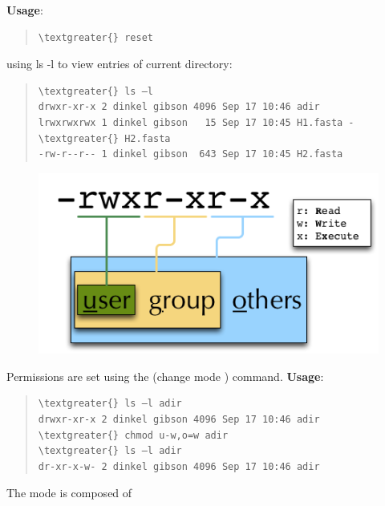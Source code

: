 \documentclass[letterpaper,10pt,english]{sphinxmanual}
\begin{document}
\textbf{Usage}:  
\begin{quote}

\begin{Verbatim}[commandchars=\\\{\}]
\textgreater{} reset
\end{Verbatim}
\end{quote}

using ls -l to view entries of current directory:
\begin{quote}

\begin{Verbatim}[commandchars=\\\{\}]
\textgreater{} ls –l
drwxr-xr-x 2 dinkel gibson 4096 Sep 17 10:46 adir
lrwxrwxrwx 1 dinkel gibson   15 Sep 17 10:45 H1.fasta -\textgreater{} H2.fasta
-rw-r--r-- 1 dinkel gibson  643 Sep 17 10:45 H2.fasta
\end{Verbatim}
\end{quote}
\begin{figure}[htbp]
\centering

\includegraphics{_static/LinuxPermissions.png}
\end{figure}

Permissions are set using the  (change mode ) command.
\textbf{Usage}:  
\begin{quote}

\begin{Verbatim}[commandchars=\\\{\}]
\textgreater{} ls –l adir
drwxr-xr-x 2 dinkel gibson 4096 Sep 17 10:46 adir
\textgreater{} chmod u-w,o=w adir
\textgreater{} ls –l adir
dr-xr-x-w- 2 dinkel gibson 4096 Sep 17 10:46 adir
\end{Verbatim}
\end{quote}

The mode is composed of
\end{document}
